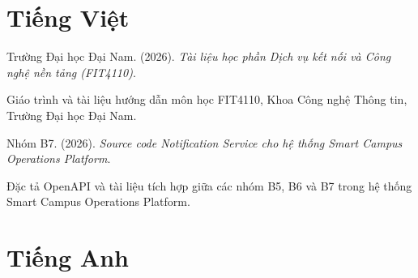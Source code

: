 
\section*{Tiếng Việt}

\begin{enumerate}[label={[\arabic*]}]

\item Trường Đại học Đại Nam. (2026). \textit{Tài liệu học phần Dịch vụ kết nối và Công nghệ nền tảng (FIT4110)}.

\item Giáo trình và tài liệu hướng dẫn môn học FIT4110, Khoa Công nghệ Thông tin, Trường Đại học Đại Nam.

\item Nhóm B7. (2026). \textit{Source code Notification Service cho hệ thống Smart Campus Operations Platform}.

\item Đặc tả OpenAPI và tài liệu tích hợp giữa các nhóm B5, B6 và B7 trong hệ thống Smart Campus Operations Platform.

\end{enumerate}

\section*{Tiếng Anh}

